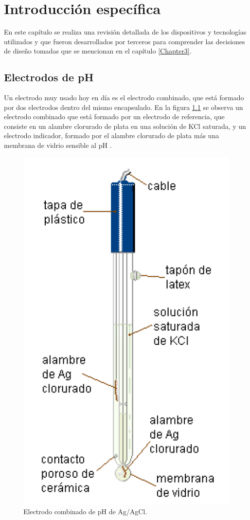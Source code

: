 \chapter{Introducción específica} %

\label{Chapter2}

En este capítulo se  realiza una revisión detallada de los dispositivos y tecnologías utilizados y que fueron desarrollados por terceros para comprender las decisiones de diseño tomadas que se mencionan en el capítulo \ref{Chapter3}. 

\section{Electrodos de pH}
\label{sec:electrodoPH}

Un electrodo muy usado hoy en día es el electrodo combinado, que está formado por dos electrodos dentro del mismo encapsulado. En la figura \ref{fig:electrodoCombinado} se observa un electrodo combinado que está formado por un electrodo de referencia, que consiste en un alambre clorurado de plata en una solución de KCl saturada, y un electrodo indicador, formado por el alambre clorurado de plata más una membrana de vidrio sensible al pH \citep{ARTICLE:4}.

\begin{figure}[htbp]
	\centering
	\includegraphics[width=.4\textwidth]{./Figures/electrodoCombinado.png}
	\caption{Electrodo combinado de pH de Ag/AgCl\protect\footnotemark.}
	\label{fig:electrodoCombinado}
\end{figure}

